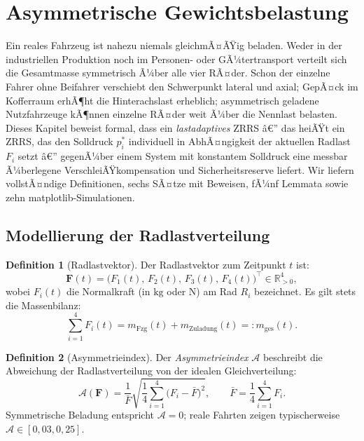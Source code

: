 ﻿\documentclass[a4paper,12pt]{article}
\theoremstyle{definition}
\newtheorem{definition}{Definition}
\begin{document}
\section{Asymmetrische Gewichtsbelastung}
\label{sec:asymm}

Ein reales Fahrzeug ist nahezu niemals gleichmÃ¤ÃŸig beladen. Weder in der
industriellen Produktion noch im Personen- oder GÃ¼tertransport verteilt sich
die Gesamtmasse symmetrisch Ã¼ber alle vier RÃ¤der. Schon der einzelne Fahrer
ohne Beifahrer verschiebt den Schwerpunkt lateral und axial; GepÃ¤ck im
Kofferraum erhÃ¶ht die Hinterachslast erheblich; asymmetrisch geladene
Nutzfahrzeuge kÃ¶nnen einzelne RÃ¤der weit Ã¼ber die Nennlast belasten. Dieses
Kapitel beweist formal, dass ein \emph{lastadaptives} ZRRS â€” das heiÃŸt ein
ZRRS, das den Solldruck $p^*_i$ individuell in AbhÃ¤ngigkeit der aktuellen
Radlast $F_i$ setzt â€” gegenÃ¼ber einem System mit konstantem Solldruck eine
messbar Ã¼berlegene VerschleiÃŸkompensation und Sicherheitsreserve liefert.
Wir liefern vollstÃ¤ndige Definitionen, sechs SÃ¤tze mit Beweisen, fÃ¼nf Lemmata
sowie zehn matplotlib-Simulationen.

\subsection{Modellierung der Radlastverteilung}

\begin{definition}[Radlastvektor]
Der Radlastvektor zum Zeitpunkt $t$ ist:
\[
    \mathbf{F}(t) = \bigl(F_1(t),\, F_2(t),\, F_3(t),\, F_4(t)\bigr)^{\top}
    \in \mathbb{R}_{>0}^4,
\]
wobei $F_i(t)$ die Normalkraft (in $\text{kg}$ oder $\text{N}$) am Rad $R_i$
bezeichnet. Es gilt stets die Massenbilanz:
\[
    \sum_{i=1}^{4} F_i(t) = m_{\text{Fzg}}(t) + m_{\text{Zuladung}}(t)
    =: m_{\text{ges}}(t).
\]
\end{definition}

\begin{definition}[Asymmetrieindex]
\label{def:asymm}
Der \emph{Asymmetrieindex} $\mathcal{A}$ beschreibt die Abweichung der
Radlastverteilung von der idealen Gleichverteilung:
\[
    \mathcal{A}(\mathbf{F}) = \frac{1}{\bar{F}}
    \sqrt{\frac{1}{4}\sum_{i=1}^{4}\bigl(F_i - \bar{F}\bigr)^2},
    \qquad \bar{F} = \frac{1}{4}\sum_{i=1}^{4} F_i.
\]
Symmetrische Beladung entspricht $\mathcal{A} = 0$; reale Fahrten zeigen
typischerweise $\mathcal{A} \in [0{,}03, 0{,}25]$.
\end{definition}
\end{document}

